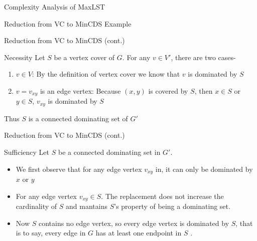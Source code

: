 \documentclass[xcolor=svgnames]{beamer}
\begin{document}
\begin{section}{Complexity Analysis of MaxLST}
\begin{frame}{Reduction from VC to MinCDS Example}
        \vspace{15pt}
    \end{frame}
    \begin{frame}{Reduction from VC to MinCDS (cont.)}
        \begin{block}{Necessity} 
        Let $S$ be a vertex cover of $G$. For any $v \in V'$, there are two cases- 
            \begin{enumerate}
                \item $v \in V $: By the definition of vertex cover we know that $v$ is dominated by $S$
                \item $v=v_{xy}$ is an edge vertex: Because $(x,y)$ is covered by $S$, then $x \in S$ or $y \in S$, $v_{xy}$ is dominated by $S$ 
            \end{enumerate}
            Thus $S$ is a connected dominating set of $G'$
        \end{block}
    \end{frame}
    \begin{frame}{Reduction from VC to MinCDS (cont.)}
        \begin{block}{Sufficiency} 
        Let $S$ be a connected dominating set in $G'$. 
            \begin{itemize}
                \item We first observe that for any edge vertex $v_{xy}$ in, it can only be dominated by $x$ or $y$
                \item For any edge vertex $v_{xy} \in S$. The replacement does not increase the cardinality of $S$ and mantains $S$'s property of being a dominating set.
                \item Now $S$ contains no edge vertex, so every edge vertex is dominated by $S$, that is to say, every edge in $G$ has at least one endpoint in $S$
.
            \end{itemize}

\end{block}
\end{frame}
\end{section}
\end{document}
